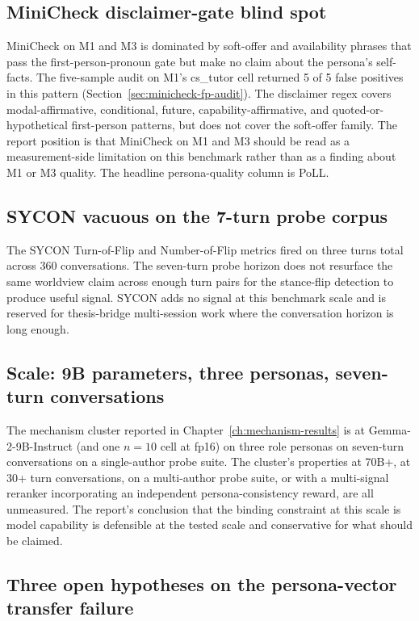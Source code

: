 \subsection{MiniCheck disclaimer-gate blind spot}

MiniCheck on M1 and M3 is dominated by soft-offer and availability phrases that pass the first-person-pronoun gate but make no claim about the persona's self-facts. The five-sample audit on M1's cs\_tutor cell returned 5 of 5 false positives in this pattern (Section~\ref{sec:minicheck-fp-audit}). The disclaimer regex covers modal-affirmative, conditional, future, capability-affirmative, and quoted-or-hypothetical first-person patterns, but does not cover the soft-offer family. The report position is that MiniCheck on M1 and M3 should be read as a measurement-side limitation on this benchmark rather than as a finding about M1 or M3 quality. The headline persona-quality column is PoLL.

\subsection{SYCON vacuous on the 7-turn probe corpus}

The SYCON Turn-of-Flip and Number-of-Flip metrics fired on three turns total across 360 conversations. The seven-turn probe horizon does not resurface the same worldview claim across enough turn pairs for the stance-flip detection to produce useful signal. SYCON adds no signal at this benchmark scale and is reserved for thesis-bridge multi-session work where the conversation horizon is long enough.

\subsection{Scale: 9B parameters, three personas, seven-turn conversations}

The mechanism cluster reported in Chapter~\ref{ch:mechanism-results} is at Gemma-2-9B-Instruct (and one $n = 10$ cell at fp16) on three role personas on seven-turn conversations on a single-author probe suite. The cluster's properties at 70B+, at 30+ turn conversations, on a multi-author probe suite, or with a multi-signal reranker incorporating an independent persona-consistency reward, are all unmeasured. The report's conclusion that the binding constraint at this scale is model capability is defensible at the tested scale and conservative for what should be claimed.

\subsection{Three open hypotheses on the persona-vector transfer failure}

